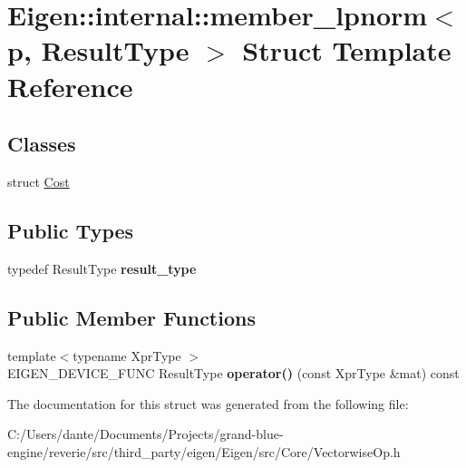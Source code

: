 \hypertarget{struct_eigen_1_1internal_1_1member__lpnorm}{}\section{Eigen\+::internal\+::member\+\_\+lpnorm$<$ p, Result\+Type $>$ Struct Template Reference}
\label{struct_eigen_1_1internal_1_1member__lpnorm}
\subsection*{Classes}
\begin{DoxyCompactItemize}
\item 
struct \mbox{\hyperlink{struct_eigen_1_1internal_1_1member__lpnorm_1_1_cost}{Cost}}
\end{DoxyCompactItemize}
\subsection*{Public Types}
\begin{DoxyCompactItemize}
\item 
\mbox{\label{struct_eigen_1_1internal_1_1member__lpnorm_ab6ab99afcf674586115a165609adb857}} 
typedef Result\+Type {\bfseries result\+\_\+type}
\end{DoxyCompactItemize}
\subsection*{Public Member Functions}
\begin{DoxyCompactItemize}
\item 
\mbox{\label{struct_eigen_1_1internal_1_1member__lpnorm_a4bc521bdca340679548e376f50d3e766}} 
{\footnotesize template$<$typename Xpr\+Type $>$ }\\E\+I\+G\+E\+N\+\_\+\+D\+E\+V\+I\+C\+E\+\_\+\+F\+U\+NC Result\+Type {\bfseries operator()} (const Xpr\+Type \&mat) const
\end{DoxyCompactItemize}


The documentation for this struct was generated from the following file\+:\begin{DoxyCompactItemize}
\item 
C\+:/\+Users/dante/\+Documents/\+Projects/grand-\/blue-\/engine/reverie/src/third\+\_\+party/eigen/\+Eigen/src/\+Core/Vectorwise\+Op.\+h\end{DoxyCompactItemize}
